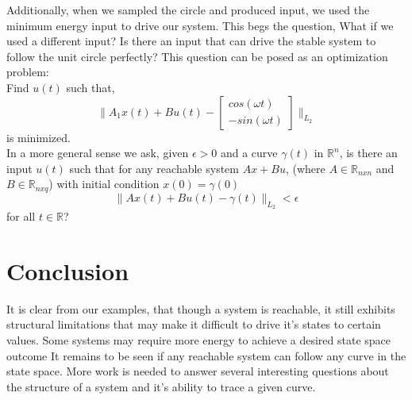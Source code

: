\documentclass[12pt,letterpaper]{article}
\begin{document}
\noindent Additionally, when we sampled the circle and produced input, we used the minimum energy input to drive our system. This begs the question, What if we used a different input? Is there an input that can drive the stable system to follow the unit circle perfectly? This question can be posed as an optimization problem:\\

Find $u(t)$ such that, 
\[ \| A_{1}x(t)+Bu(t) - \begin{bmatrix} cos(\omega t) \\ -sin(\omega t)\end{bmatrix} \|_{L_{2}}\]
is minimized. \\ 

\noindent In a more general sense we ask, given $\epsilon > 0$ and a curve $\gamma(t)$ in $\mathbb{R}^{n}$, is there an input $u(t)$ such that for any reachable system $Ax+Bu$, (where $A \in \mathbb{R}_{nxn}$ and $B \in \mathbb{R}_{nxq}$) with initial condition $x(0) = \gamma(0)$
\[\|Ax(t)+Bu(t) - \gamma(t)\|_{L_{2}} < \epsilon \] for all $t \in \mathbb{R}$?

\section{Conclusion}

It is clear from our examples, that though a system is reachable, it still exhibits structural limitations that may make it difficult to drive it's states to certain values. Some systems may require more energy to achieve a desired state space outcome It remains to be seen if any reachable system can follow any curve in the state space. More work is needed to answer several interesting questions about the structure of a system and it's ability to trace a given curve.
\end{document}
